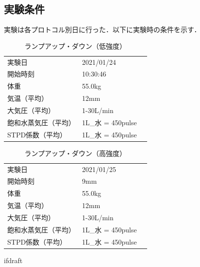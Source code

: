 \subsection{実験条件}

実験は各プロトコル別日に行った．以下に実験時の条件を示す．

\begin{table}[h]
  \begin{center}
  \caption{ランプアップ・ダウン（低強度）}
  \label{tb:YFS201_specsheet}
    \begin{tabular}{ll}
      実験日 & 2021/01/24 \\
      開始時刻 & 10:30:46 \\
      体重 & 55.0kg \\
      気温（平均） & 12mm \\
      大気圧（平均） & 1-30L/min \\
      飽和水蒸気圧（平均） & 1L_{水} = 450pulse　\\
      STPD係数（平均） & 1L_{水} = 450pulse
    \end{tabular}
  \end{center}
\end{table}

\begin{table}[h]
  \begin{center}
  \caption{ランプアップ・ダウン（高強度）}
  \label{tb:YFS201_specsheet}
    \begin{tabular}{ll}
      実験日 & 2021/01/25 \\
      開始時刻 & 9mm \\
      体重 & 55.0kg \\
      気温（平均） & 12mm \\
      大気圧（平均） & 1-30L/min \\
      飽和水蒸気圧（平均） & 1L_{水} = 450pulse　\\
      STPD係数（平均） & 1L_{水} = 450pulse
    \end{tabular}
  \end{center}
\end{table}

\expandafter\ifx\csname ifdraft\endcsname\relax
  
\fi
